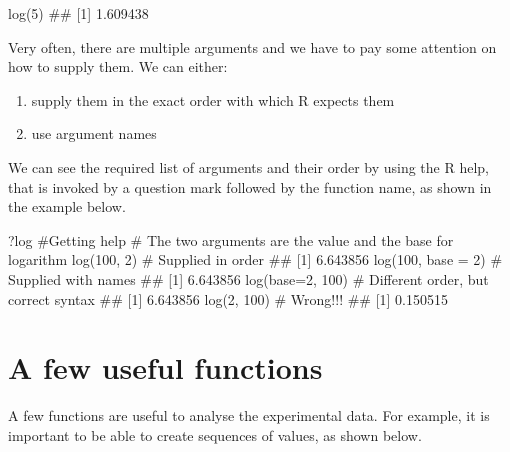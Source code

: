 \documentclass[a4paper,12pt,oneside]{book}
\providecommand{\tightlist}{%
  \setlength{\itemsep}{0pt}\setlength{\parskip}{0pt}}
\newenvironment{Shaded}{\begin{snugshade}}{\end{snugshade}}
\newcommand{\DecValTok}[1]{#1}
\newcommand{\CommentTok}[1]{#1}
\newcommand{\DocumentationTok}[1]{#1}
\newcommand{\FunctionTok}[1]{#1}
\newcommand{\AttributeTok}[1]{#1}
\newcommand{\NormalTok}[1]{#1}
\begin{document}
\begin{Shaded}
\begin{Highlighting}[]
\FunctionTok{log}\NormalTok{(}\DecValTok{5}\NormalTok{)}
\DocumentationTok{\#\# [1] 1.609438}
\end{Highlighting}
\end{Shaded}

Very often, there are multiple arguments and we have to pay some attention on how to supply them. We can either:

\begin{enumerate}
\def\labelenumi{\arabic{enumi}.}
\tightlist
\item
  supply them in the exact order with which R expects them
\item
  use argument names
\end{enumerate}

We can see the required list of arguments and their order by using the R help, that is invoked by a question mark followed by the function name, as shown in the example below.

\begin{Shaded}
\begin{Highlighting}[]
\NormalTok{?log }\CommentTok{\#Getting help}
\CommentTok{\# The two arguments are the value and the base for logarithm}
\FunctionTok{log}\NormalTok{(}\DecValTok{100}\NormalTok{, }\DecValTok{2}\NormalTok{) }\CommentTok{\# Supplied in order}
\DocumentationTok{\#\# [1] 6.643856}
\FunctionTok{log}\NormalTok{(}\DecValTok{100}\NormalTok{, }\AttributeTok{base =} \DecValTok{2}\NormalTok{) }\CommentTok{\# Supplied with names}
\DocumentationTok{\#\# [1] 6.643856}
\FunctionTok{log}\NormalTok{(}\AttributeTok{base=}\DecValTok{2}\NormalTok{, }\DecValTok{100}\NormalTok{) }\CommentTok{\# Different order, but correct syntax}
\DocumentationTok{\#\# [1] 6.643856}
\FunctionTok{log}\NormalTok{(}\DecValTok{2}\NormalTok{, }\DecValTok{100}\NormalTok{) }\CommentTok{\# Wrong!!!}
\DocumentationTok{\#\# [1] 0.150515}
\end{Highlighting}
\end{Shaded}

\hypertarget{a-few-useful-functions}{%
\section{A few useful functions}\label{a-few-useful-functions}}

A few functions are useful to analyse the experimental data. For example, it is important to be able to create sequences of values, as shown below.
\end{document}
